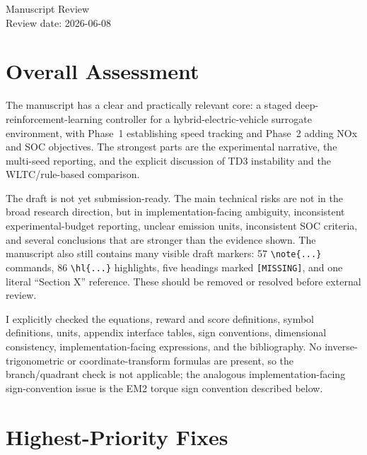 \documentclass[11pt]{article}
\begin{document}
\begin{center}
  {\Large Manuscript Review}\\[0.5em]
  {\normalsize Review date: 2026-06-08}
\end{center}

\section*{Overall Assessment}

The manuscript has a clear and practically relevant core: a staged deep-reinforcement-learning controller for a hybrid-electric-vehicle surrogate environment, with Phase~1 establishing speed tracking and Phase~2 adding NOx and SOC objectives. The strongest parts are the experimental narrative, the multi-seed reporting, and the explicit discussion of TD3 instability and the WLTC/rule-based comparison.

The draft is not yet submission-ready. The main technical risks are not in the broad research direction, but in implementation-facing ambiguity, inconsistent experimental-budget reporting, unclear emission units, inconsistent SOC criteria, and several conclusions that are stronger than the evidence shown. The manuscript also still contains many visible draft markers: 57 \verb|\note{...}| commands, 86 \verb|\hl{...}| highlights, five headings marked \texttt{[MISSING]}, and one literal ``Section X'' reference. These should be removed or resolved before external review.

I explicitly checked the equations, reward and score definitions, symbol definitions, units, appendix interface tables, sign conventions, dimensional consistency, implementation-facing expressions, and the bibliography. No inverse-trigonometric or coordinate-transform formulas are present, so the branch/quadrant check is not applicable; the analogous implementation-facing sign-convention issue is the EM2 torque sign convention described below.

\section*{Highest-Priority Fixes}
\end{document}

